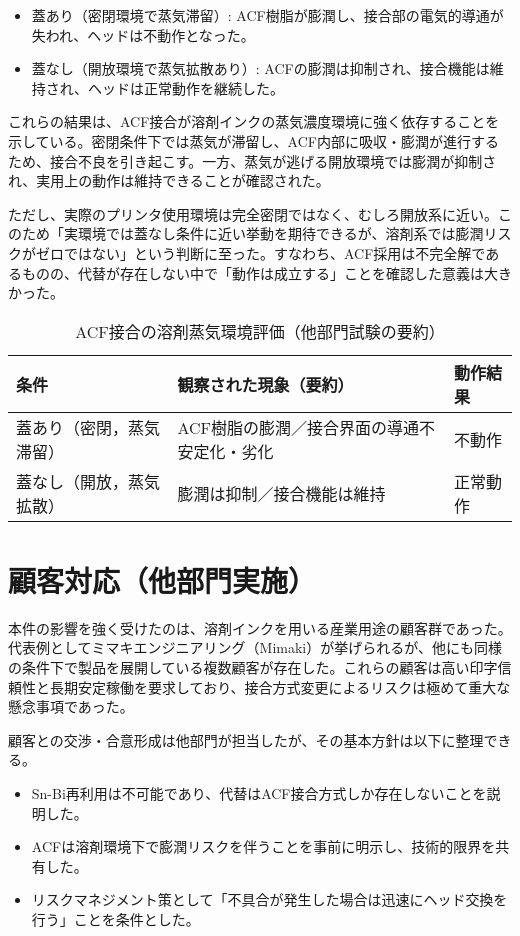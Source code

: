 \documentclass[conference]{IEEEtran}
\begin{document}
\begin{itemize}
 \item 蓋あり（密閉環境で蒸気滞留）: ACF樹脂が膨潤し、接合部の電気的導通が失われ、ヘッドは不動作となった。
 \item 蓋なし（開放環境で蒸気拡散あり）: ACFの膨潤は抑制され、接合機能は維持され、ヘッドは正常動作を継続した。
\end{itemize}

これらの結果は、ACF接合が溶剤インクの蒸気濃度環境に強く依存することを示している。密閉条件下では蒸気が滞留し、ACF内部に吸収・膨潤が進行するため、接合不良を引き起こす。一方、蒸気が逃げる開放環境では膨潤が抑制され、実用上の動作は維持できることが確認された。  

ただし、実際のプリンタ使用環境は完全密閉ではなく、むしろ開放系に近い。このため「実環境では蓋なし条件に近い挙動を期待できるが、溶剤系では膨潤リスクがゼロではない」という判断に至った。すなわち、ACF採用は不完全解であるものの、代替が存在しない中で「動作は成立する」ことを確認した意義は大きかった。

\begin{table}[t]
\centering
\footnotesize
\caption{ACF接合の溶剤蒸気環境評価（他部門試験の要約）}
\label{tab:solvent}
\renewcommand{\arraystretch}{1.1}
\begin{tabularx}{\columnwidth}{@{}p{2.2cm} Y p{1.9cm}@{}}
\toprule
条件 & 観察された現象（要約） & 動作結果 \\
\midrule
蓋あり（密閉，蒸気滞留） &
ACF樹脂の膨潤／接合界面の導通不安定化・劣化 &
不動作 \\
\addlinespace[2pt]
蓋なし（開放，蒸気拡散） &
膨潤は抑制／接合機能は維持 &
正常動作 \\
\bottomrule
\end{tabularx}
\end{table}

\section{顧客対応（他部門実施）}
本件の影響を強く受けたのは、溶剤インクを用いる産業用途の顧客群であった。代表例としてミマキエンジニアリング（Mimaki）が挙げられるが、他にも同様の条件下で製品を展開している複数顧客が存在した。これらの顧客は高い印字信頼性と長期安定稼働を要求しており、接合方式変更によるリスクは極めて重大な懸念事項であった。  

顧客との交渉・合意形成は他部門が担当したが、その基本方針は以下に整理できる。  

\begin{itemize}
 \item Sn-Bi再利用は不可能であり、代替はACF接合方式しか存在しないことを説明した。  
 \item ACFは溶剤環境下で膨潤リスクを伴うことを事前に明示し、技術的限界を共有した。  
 \item リスクマネジメント策として「不具合が発生した場合は迅速にヘッド交換を行う」ことを条件とした。  
\end{itemize}
\end{document}
